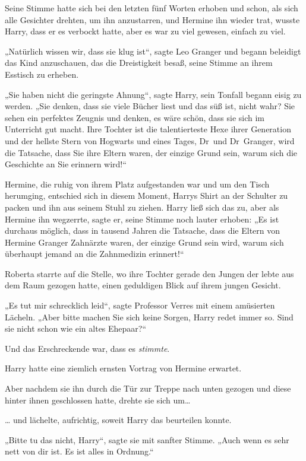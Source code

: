 {Seine Stimme hatte sich bei den letzten fünf Worten erhoben und schon, als sich alle Gesichter drehten, um ihn anzustarren, und Hermine ihn wieder trat, wusste Harry, dass er es verbockt hatte, aber es war zu viel gewesen, einfach zu viel.

„Natürlich wissen wir, dass sie klug ist“, sagte Leo Granger und begann beleidigt das Kind anzuschauen, das die Dreistigkeit besaß, seine Stimme an ihrem Esstisch zu erheben.

„Sie haben nicht die geringste Ahnung“, sagte Harry, sein Tonfall begann eisig zu werden. „Sie denken, dass sie viele Bücher liest und das süß ist, nicht wahr? Sie sehen ein perfektes Zeugnis und denken, es wäre schön, dass sie sich im Unterricht gut macht. Ihre Tochter ist die talentierteste Hexe ihrer Generation und der hellste Stern von Hogwarts und eines Tages, Dr~und Dr~Granger, wird die Tatsache, dass Sie ihre Eltern waren, der einzige Grund sein, warum sich die Geschichte an Sie erinnern wird!“

Hermine, die ruhig von ihrem Platz aufgestanden war und um den Tisch herumging, entschied sich in diesem Moment, Harrys Shirt an der Schulter zu packen und ihn aus seinem Stuhl zu ziehen. Harry ließ sich das zu, aber als Hermine ihn wegzerrte, sagte er, seine Stimme noch lauter erhoben: „Es ist durchaus möglich, dass in tausend Jahren die Tatsache, dass die Eltern von Hermine Granger Zahnärzte waren, der einzige Grund sein wird, warum sich überhaupt jemand an die Zahnmedizin erinnert!“

Roberta starrte auf die Stelle, wo ihre Tochter gerade den Jungen der lebte aus dem Raum gezogen hatte, einen geduldigen Blick auf ihrem jungen Gesicht.

„Es tut mir schrecklich leid“, sagte Professor Verres mit einem amüsierten Lächeln. „Aber bitte machen Sie sich keine Sorgen, Harry redet immer so. Sind sie nicht schon wie ein altes Ehepaar?“

Und das Erschreckende war, dass es \emph{stimmte}.

Harry hatte eine ziemlich ernsten Vortrag von Hermine erwartet.

Aber nachdem sie ihn durch die Tür zur Treppe nach unten gezogen und diese hinter ihnen geschlossen hatte, drehte sie sich um…

… und lächelte, aufrichtig, soweit Harry das beurteilen konnte.

„Bitte tu das nicht, Harry“, sagte sie mit sanfter Stimme. „Auch wenn es sehr nett von dir ist. Es ist alles in Ordnung.“

}
